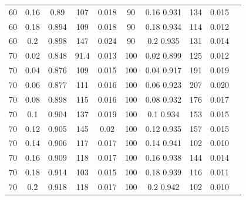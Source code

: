 \documentclass[12pt]{article}
\begin{document}
\begin{table}[h!]
\begin{tabular}{c c | c | c c ||c c | c | c c |}
			60	&	0.16	&	0.89	&	107	&	0.018	&	90	&	0.16	0.931	&	134	&	0.015\\ 
			60	&	0.18	&	0.894	&	109	&	0.018	&	90	&	0.18	0.934	&	114	&	0.012\\ 
			60	&	0.2	&	0.898	&	147	&	0.024	&	90	&	0.2	0.935	&	131	&	0.014\\ 
			70	&	0.02	&	0.848	&	91.4	&	0.013	&	100	&	0.02	0.899	&	125	&	0.012\\ 
			70	&	0.04	&	0.876	&	109	&	0.015	&	100	&	0.04	0.917	&	191	&	0.019\\ 
			70	&	0.06	&	0.877	&	111	&	0.016	&	100	&	0.06	0.923	&	207	&	0.020\\ 
			70	&	0.08	&	0.898	&	115	&	0.016	&	100	&	0.08	0.932	&	176	&	0.017\\ 
			70	&	0.1	&	0.904	&	137	&	0.019	&	100	&	0.1	0.934	&	153	&	0.015\\ 
			70	&	0.12	&	0.905	&	145	&	0.02	&	100	&	0.12	0.935	&	157	&	0.015\\ 
			70	&	0.14	&	0.906	&	117	&	0.017	&	100	&	0.14	0.941	&	102	&	0.010\\ 
			70	&	0.16	&	0.909	&	118	&	0.017	&	100	&	0.16	0.938	&	144	&	0.014\\ 
			70	&	0.18	&	0.914	&	103	&	0.015	&	100	&	0.18	0.939	&	116	&	0.011\\ 
			70	&	0.2	&	0.918	&	118	&	0.017	&	100	&	0.2	0.942	&	102	&	0.010\\ 
			\hline
		\end{tabular}
		\end{table}
\end{document}
